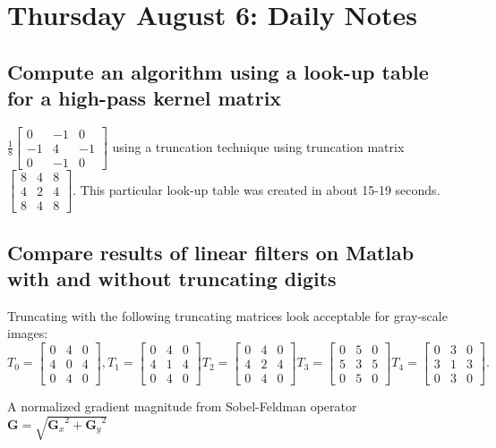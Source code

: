 \documentclass[12pt]{amsart}
\theoremstyle{definition}
\theoremstyle{remark}
\numberwithin{thm}{section}
\begin{document}
\section{Thursday August 6: Daily Notes}
\subsection{Compute an algorithm using a look-up table for a high-pass kernel matrix} 
$\frac{1}{8}
\begin{bmatrix}
0 & -1 & 0\\
-1 & 4 & -1\\
0 & -1 & 0
\end{bmatrix}$ using a truncation technique using truncation matrix
$\begin{bmatrix}
8 &4 &8\\
4 &2 &4\\
8 &4 &8
\end{bmatrix}$. This particular look-up table was created in about 15-19 seconds.

\subsection{
Compare results of linear filters on Matlab with and without truncating digits}
Truncating with the following truncating matrices look acceptable for gray-scale images:
$
T_0=
\begin{bmatrix}
0 &4 &0\\
4 &0 &4\\
0 &4 &0
\end{bmatrix},
T_1=
\begin{bmatrix}
0 &4 &0\\
4 &1 &4\\
0 &4 &0
\end{bmatrix}
T_2=
\begin{bmatrix}
0 &4 &0\\
4 &2 &4\\
0 &4 &0
\end{bmatrix}
T_3=
\begin{bmatrix}
0 &5 &0\\
5 &3 &5\\ 
0 &5 &0
\end{bmatrix}
T_4=
\begin{bmatrix}
0 &3 &0\\
3 &1 &3\\
0 &3 &0
\end{bmatrix}
.$

A normalized gradient magnitude from Sobel-Feldman operator \cite{Wikipedia/Sobel}
$\mathbf{G} = \sqrt{ {\mathbf{G}_x}^2 + {\mathbf{G}_y}^2 }$
\end{document}
